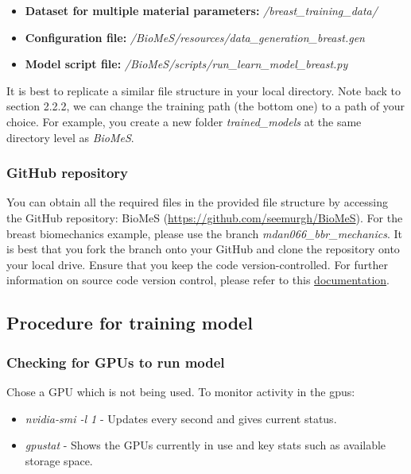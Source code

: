 \documentclass[11pt]{article}
\providecommand{\tightlist}{%
      \setlength{\itemsep}{0pt}\setlength{\parskip}{0pt}}
\begin{document}
\begin{itemize}
\tightlist
\item 
\textbf{Dataset for multiple material parameters:} \textit{/breast\_training\_data/}

\item
\textbf{Configuration file:} \textit{/BioMeS/resources/data\_generation\_breast.gen}

\item
\textbf{Model script file:} \textit{/BioMeS/scripts/run\_learn\_model\_breast.py}

\end{itemize}

It is best to replicate a similar file structure in your local directory. Note back to section 2.2.2, we can change the training path (the bottom one) to a path of your choice. For example, you create a new folder \textit{trained\_models} at the same directory level as \textit{BioMeS}. 

\subsubsection{GitHub repository}
You can obtain all the required files in the provided file structure by accessing the GitHub repository: BioMeS (\url{https://github.com/seemurgh/BioMeS}). For the breast biomechanics example, please use the branch \textit{mdan066\_bbr\_mechanics}. It is best that you fork the branch onto your GitHub and clone the repository onto your local drive. Ensure that you keep the code version-controlled. For further information on source code version control, please refer to this \href{https://research-software-development-tutorials.readthedocs.io/en/latest/beginner/managing_source_code.html}{documentation}.

\subsection{Procedure for training model}

\subsubsection{Checking for GPUs to run model}\label{GPUs}
Chose a GPU which is not being used. To monitor activity in the gpus: 
\begin{itemize}
\tightlist
\item \textit{nvidia-smi -l 1} - Updates every second and gives current status. 
\item \textit{gpustat} - Shows the GPUs currently in use and key stats such as available storage space.
\end{itemize}
\end{document}
